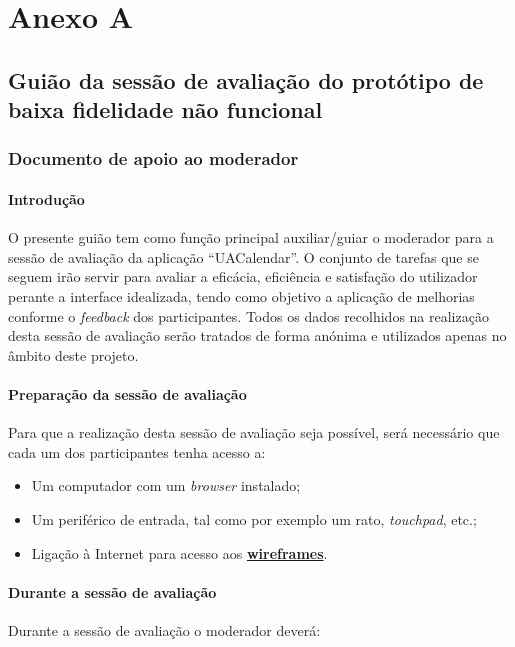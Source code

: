 \documentclass[11pt, twoside]{report}
\begin{document}
	\chapter*{Anexo A}
		\section*{Guião da sessão de avaliação do protótipo de baixa fidelidade não funcional}
		\subsection*{Documento de apoio ao moderador}
			
		
		\subsubsection*{Introdução}
	O presente guião tem como função principal auxiliar/guiar o moderador para a sessão de avaliação da aplicação “UACalendar”.
	O conjunto de tarefas que se seguem irão servir para avaliar a eficácia, eficiência e satisfação do utilizador perante a interface idealizada, tendo como objetivo a aplicação de melhorias conforme o \textit{feedback} dos participantes.
	Todos os dados recolhidos na realização desta sessão de avaliação serão tratados de forma anónima e utilizados apenas no âmbito deste projeto.
		
		
	\subsubsection*{Preparação da sessão de avaliação}
			Para que a realização desta sessão de avaliação seja possível, será necessário que cada um dos participantes tenha acesso a:
	
	\begin{itemize}
		\item Um computador com um \textit{browser} instalado;
		\item Um periférico de entrada, tal como por exemplo um rato, \textit{touchpad}, etc.;
		\item Ligação à Internet para acesso aos \href{https://www.figma.com/file/nhb5nnIrt3fdDoQhYpsN80/Calendario?node-id=9\%3A154}{\textbf{wireframes}}.
	\end{itemize}

\subsubsection*{Durante a sessão de avaliação}	
Durante a sessão de avaliação o moderador deverá:
\end{document}
